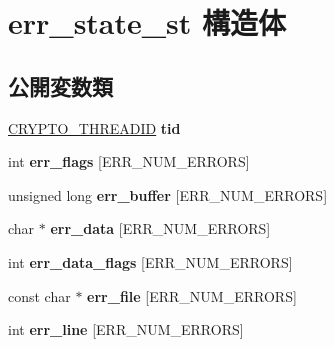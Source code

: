 \hypertarget{structerr__state__st}{}\section{err\+\_\+state\+\_\+st 構造体}
\label{structerr__state__st}
\subsection*{公開変数類}
\begin{DoxyCompactItemize}
\item 
\hypertarget{structerr__state__st_a9bc9ea657d62cb9d4875cdecb09993b4}{}\hyperlink{structcrypto__threadid__st}{C\+R\+Y\+P\+T\+O\+\_\+\+T\+H\+R\+E\+A\+D\+I\+D} {\bfseries tid}\label{structerr__state__st_a9bc9ea657d62cb9d4875cdecb09993b4}

\item 
\hypertarget{structerr__state__st_ae822060964906dc8a605919d29b20a2c}{}int {\bfseries err\+\_\+flags} \mbox{[}E\+R\+R\+\_\+\+N\+U\+M\+\_\+\+E\+R\+R\+O\+R\+S\mbox{]}\label{structerr__state__st_ae822060964906dc8a605919d29b20a2c}

\item 
\hypertarget{structerr__state__st_a6093e57e37a565c5c2ade7453856e0b8}{}unsigned long {\bfseries err\+\_\+buffer} \mbox{[}E\+R\+R\+\_\+\+N\+U\+M\+\_\+\+E\+R\+R\+O\+R\+S\mbox{]}\label{structerr__state__st_a6093e57e37a565c5c2ade7453856e0b8}

\item 
\hypertarget{structerr__state__st_a75311ccdf3c5e3ab976b6b134e4ea4de}{}char $\ast$ {\bfseries err\+\_\+data} \mbox{[}E\+R\+R\+\_\+\+N\+U\+M\+\_\+\+E\+R\+R\+O\+R\+S\mbox{]}\label{structerr__state__st_a75311ccdf3c5e3ab976b6b134e4ea4de}

\item 
\hypertarget{structerr__state__st_a929c4ef844d860715e5df4935630f23c}{}int {\bfseries err\+\_\+data\+\_\+flags} \mbox{[}E\+R\+R\+\_\+\+N\+U\+M\+\_\+\+E\+R\+R\+O\+R\+S\mbox{]}\label{structerr__state__st_a929c4ef844d860715e5df4935630f23c}

\item 
\hypertarget{structerr__state__st_aa8ac00e8b6a07603d015b3e067a764ea}{}const char $\ast$ {\bfseries err\+\_\+file} \mbox{[}E\+R\+R\+\_\+\+N\+U\+M\+\_\+\+E\+R\+R\+O\+R\+S\mbox{]}\label{structerr__state__st_aa8ac00e8b6a07603d015b3e067a764ea}

\item 
\hypertarget{structerr__state__st_abdfef5b4788717ba882fda5b02c7597c}{}int {\bfseries err\+\_\+line} \mbox{[}E\+R\+R\+\_\+\+N\+U\+M\+\_\+\+E\+R\+R\+O\+R\+S\mbox{]}\label{structerr__state__st_abdfef5b4788717ba882fda5b02c7597c}


\end{DoxyCompactItemize}
